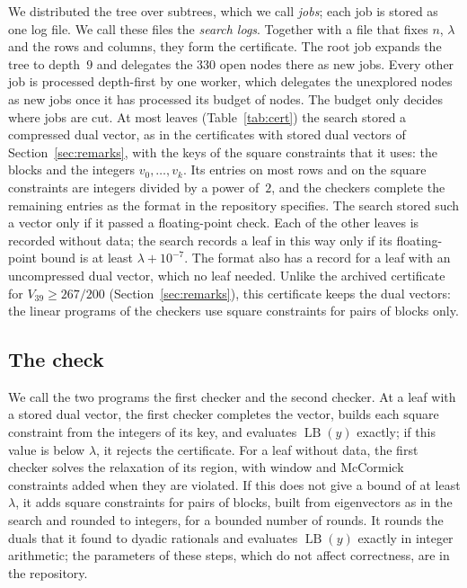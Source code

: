 \documentclass[11pt]{amsart}
\theoremstyle{definition}
\theoremstyle{remark}
\numberwithin{equation}{section}
\newcommand{\LB}{\operatorname{LB}}
\begin{document}
We distributed the tree over subtrees, which we call \emph{jobs}; each job is stored as one log file. We call these files the \emph{search logs}. Together with a file that fixes $n$, $\lambda$ and the rows and columns, they form the certificate. The root job expands the tree to depth~$9$ and delegates the $330$ open nodes there as new jobs. Every other job is processed depth-first by one worker, which delegates the unexplored nodes as new jobs once it has processed its budget of nodes. The budget only decides where jobs are cut. At most leaves (Table~\ref{tab:cert}) the search stored a compressed dual vector, as in the certificates with stored dual vectors of Section~\ref{sec:remarks}, with the keys of the square constraints that it uses: the blocks and the integers $v_0,\dots,v_k$. Its entries on most rows and on the square constraints are integers divided by a power of~$2$, and the checkers complete the remaining entries as the format in the repository specifies. The search stored such a vector only if it passed a floating-point check. Each of the other leaves is recorded without data; the search records a leaf in this way only if its floating-point bound is at least $\lambda+10^{-7}$. The format also has a record for a leaf with an uncompressed dual vector, which no leaf needed. Unlike the archived certificate for $V_{39}\ge267/200$ (Section~\ref{sec:remarks}), this certificate keeps the dual vectors: the linear programs of the checkers use square constraints for pairs of blocks only.

\subsection{The check}\label{sec:check} We call the two programs the first checker and the second checker. At a leaf with a stored dual vector, the first checker completes the vector, builds each square constraint from the integers of its key, and evaluates $\LB(y)$ exactly; if this value is below $\lambda$, it rejects the certificate. For a leaf without data, the first checker solves the relaxation of its region, with window and McCormick constraints added when they are violated. If this does not give a bound of at least $\lambda$, it adds square constraints for pairs of blocks, built from eigenvectors as in the search and rounded to integers, for a bounded number of rounds. It rounds the duals that it found to dyadic rationals and evaluates $\LB(y)$ exactly in integer arithmetic; the parameters of these steps, which do not affect correctness, are in the repository.
\end{document}
